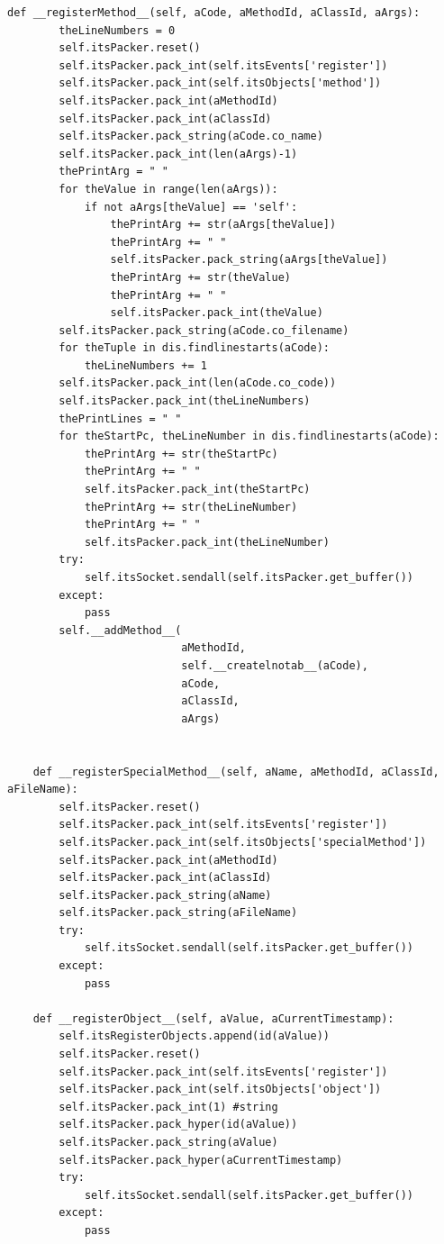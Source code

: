 \documentclass[12pt,legalpaper]{report}
\begin{document}
\begin{singlespace}
\begin{lstlisting}[style=Python]
    def __registerMethod__(self, aCode, aMethodId, aClassId, aArgs):
        theLineNumbers = 0
        self.itsPacker.reset()
        self.itsPacker.pack_int(self.itsEvents['register'])
        self.itsPacker.pack_int(self.itsObjects['method'])
        self.itsPacker.pack_int(aMethodId)
        self.itsPacker.pack_int(aClassId)
        self.itsPacker.pack_string(aCode.co_name)
        self.itsPacker.pack_int(len(aArgs)-1)
        thePrintArg = " "
        for theValue in range(len(aArgs)):
            if not aArgs[theValue] == 'self':
                thePrintArg += str(aArgs[theValue])
                thePrintArg += " "
                self.itsPacker.pack_string(aArgs[theValue])
                thePrintArg += str(theValue)
                thePrintArg += " "
                self.itsPacker.pack_int(theValue)
        self.itsPacker.pack_string(aCode.co_filename)
        for theTuple in dis.findlinestarts(aCode):
            theLineNumbers += 1
        self.itsPacker.pack_int(len(aCode.co_code))        
        self.itsPacker.pack_int(theLineNumbers)
        thePrintLines = " "
        for theStartPc, theLineNumber in dis.findlinestarts(aCode):
            thePrintArg += str(theStartPc)
            thePrintArg += " "            
            self.itsPacker.pack_int(theStartPc)
            thePrintArg += str(theLineNumber)
            thePrintArg += " "            
            self.itsPacker.pack_int(theLineNumber)
        try:
            self.itsSocket.sendall(self.itsPacker.get_buffer())
        except:
            pass
        self.__addMethod__(
                           aMethodId,
                           self.__createlnotab__(aCode),
                           aCode,
                           aClassId,
                           aArgs)
        
        
    def __registerSpecialMethod__(self, aName, aMethodId, aClassId, aFileName):
        self.itsPacker.reset()
        self.itsPacker.pack_int(self.itsEvents['register'])
        self.itsPacker.pack_int(self.itsObjects['specialMethod'])
        self.itsPacker.pack_int(aMethodId)
        self.itsPacker.pack_int(aClassId)
        self.itsPacker.pack_string(aName)
        self.itsPacker.pack_string(aFileName)
        try:
            self.itsSocket.sendall(self.itsPacker.get_buffer())
        except:
            pass
        
    def __registerObject__(self, aValue, aCurrentTimestamp):
        self.itsRegisterObjects.append(id(aValue))
        self.itsPacker.reset()
        self.itsPacker.pack_int(self.itsEvents['register'])
        self.itsPacker.pack_int(self.itsObjects['object'])
        self.itsPacker.pack_int(1) #string
        self.itsPacker.pack_hyper(id(aValue))
        self.itsPacker.pack_string(aValue)
        self.itsPacker.pack_hyper(aCurrentTimestamp)
        try:
            self.itsSocket.sendall(self.itsPacker.get_buffer())
        except:
            pass
    

\end{lstlisting}
\end{singlespace}
\end{document}
